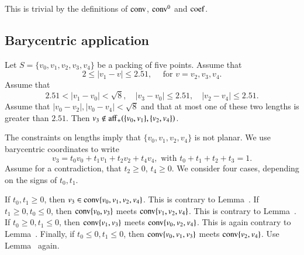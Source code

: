 \begin{tarskidata}
\begin{tarski}
\begin{proved}  This is trivial by the definitions
of ${\operatorname{conv}}$, ${\operatorname{conv}}^0$ and ${\operatorname{coef}}$.
\swallowed\end{proved}
\end{tarski}














\begin{tarski}
\section{Barycentric application}

\begin{lemma}
Let $S=\{v_0,v_1,v_2,v_3,v_4\}$ be a packing of five points.
Assume that
  $$2\le |v_1-v|\le 2.51,\quad \text{ for } v = v_2,v_3,v_4.$$
Assume that
  $$2.51 < |v_1-v_0| < \sqrt8,\quad |v_3-v_0|\le 2.51,
   \quad |v_2-v_4|\le2.51.$$
Assume that $|v_0-v_2|,|v_0-v_4|<\sqrt8$ and that
at most one of these two lengths is greater than $2.51$.
Then $v_3\not\in{\operatorname{aff}}_+(\{v_0,v_1\},\{v_2,v_4\})$.
\end{lemma}



\begin{proved}
The constraints on lengths imply that $\{v_0,v_1,v_2,v_4\}$
is not planar.  We use barycentric 
coordinates to write
  $$
  v_3 = t_0 v_0 + t_1 v_1 + t_2 v_2 + t_4 v_4, \text{ with } t_0+t_1+t_2+t_3=1.
  $$
Assume for a contradiction, that $t_2\ge0$, $t_4\ge0$.
We consider four cases, depending on the signs of $t_0,t_1$.

If $t_0,t_1\ge0$, then $v_3\in{\operatorname{conv}}\{v_0,v_1,v_2,v_4\}$.
This is contrary to Lemma~.
If $t_1\ge0,t_0\le0$, then ${\operatorname{conv}}\{v_0,v_3\}$ meets
${\operatorname{conv}}\{v_1,v_2,v_4\}$.  
This is contrary to Lemma~.
If $t_0\ge0,t_1\le0$, then ${\operatorname{conv}}\{v_1,v_3\}$ meets
${\operatorname{conv}}\{v_0,v_2,v_4\}$.  
This is again contrary to Lemma~.  Finally, if
$t_0\le0,t_1\le0$, then ${\operatorname{conv}}\{v_0,v_1,v_3\}$ meets 
${\operatorname{conv}}\{v_2,v_4\}$.  
Use Lemma~ again.
\swallowed\end{proved}
\end{tarski}






\end{tarskidata}
